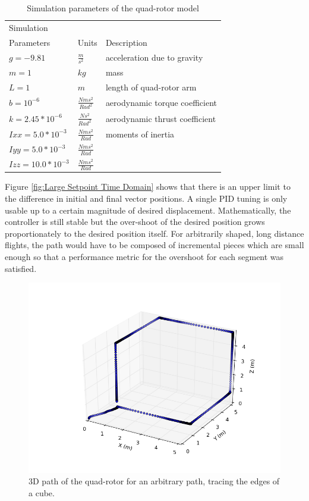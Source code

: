 \begin{table}
\label{table:params}
\begin{doublespace}
\centering
\begin{tabular}{l l l}
    Simulation\\ Parameters & Units & Description\\
    \hline
    $g = -9.81            $& $ \frac{m}{s^2}          $ & acceleration due to gravity\\
    $m = 1                $& $ kg                      $ & mass\\
    $L = 1                $& $ m                       $ & length of quad-rotor arm\\
    $b = 10^{-6}          $& $ \frac{N m s^2}{Rad^2}  $ & aerodynamic torque coefficient\\
    $k = 2.45*10^{-6}     $& $ \frac{N s^2}{Rad^2}    $ & aerodynamic thrust coefficient\\
    $Ixx = 5.0*10^{-3}    $& $ \frac{N m s^2}{Rad}    $ & moments of inertia \\
    $Iyy = 5.0*10^{-3}    $& $ \frac{N m s^2}{Rad}    $ & \\
    $Izz = 10.0*10^{-3}   $& $ \frac{N m s^2}{Rad}    $ & \\
    \hline
\end{tabular}
\caption[Simulation Parameters]{Simulation parameters of the quad-rotor model}
\end{doublespace}
\end{table}
Figure \ref{fig:Large Setpoint Time Domain} shows that there is an upper limit to the difference in initial and final vector positions. A single PID tuning is only usable up to a certain magnitude of desired displacement. Mathematically, the controller is still stable but the over-shoot of the desired position grows proportionately to the desired position itself. For arbitrarily shaped, long distance flights, the path would have to be composed of incremental pieces which are small enough so that a performance metric for the overshoot for each segment was satisfied.
\begin{figure}[htbp]
	\centering
		\includegraphics[scale = 0.4]{Figures/CubeEdges3D.png}
	\caption[Cube Edges 3D]{3D path of the quad-rotor for an arbitrary path, tracing the edges of a cube.}
	\label{fig:Cube Edges 3D}
\end{figure}
